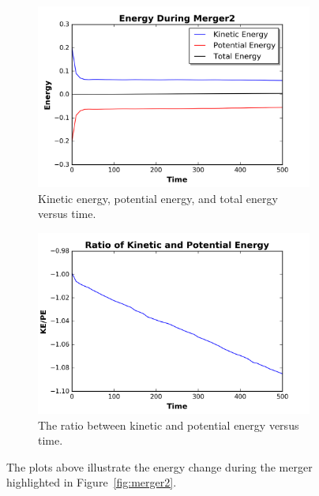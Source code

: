 \documentclass[12pt]{report}
\begin{document}
  
\begin{figure}[H]
\centering 
    \begin{subfigure}[b]{.475\textwidth}
        \centering
        \includegraphics[width=\linewidth]{totenergy_merger2.png}
        \caption[]%
        {{Kinetic energy, potential energy, and total energy versus time.}}
    
        \label{fig:totalenergy_merger2}
    \end{subfigure} %
    \hfill
    \begin{subfigure}[b]{.475\textwidth}
        \centering
        \includegraphics[width=\linewidth]{ratioenergy_merger2.png}
        \caption[]%
        {{The ratio between kinetic and potential energy versus time.}}
        \label{fig:ratiomerger2}
    \end{subfigure} %
    \caption[]
        {The plots above illustrate the energy change during the merger highlighted in Figure~\ref{fig:merger2}.} 
        \label{fig:energyofmerger2}
\end{figure}
\end{document}
